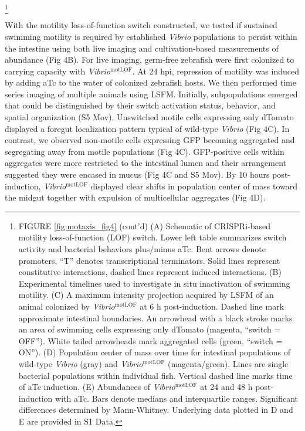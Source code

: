 {{{{\let\thefootnote\relax\footnote{FIGURE \ref{fig:motaxis_fig4} (cont'd) (A) Schematic of CRISPRi-based motility loss-of-function (LOF) switch. Lower left table summarizes switch activity and bacterial behaviors plus/minus aTc. Bent arrows denote promoters, ``T'' denotes transcriptional terminators. Solid lines represent constitutive interactions, dashed lines represent induced interactions. (B) Experimental timelines used to investigate in situ inactivation of swimming motility. (C) A maximum intensity projection acquired by LSFM of an animal colonized by \textit{Vibrio}$^{\text{motLOF}}$ at 6 h post-induction. Dashed line mark approximate intestinal boundaries. An arrowhead with a black stroke marks an area of swimming cells expressing only dTomato (magenta, ``switch = OFF''). White tailed arrowheads mark aggregated cells (green, ``switch = ON''). (D) Population center of mass over time for intestinal populations of wild-type \textit{Vibrio} (gray) and \textit{Vibrio}$^{\text{motLOF}}$ (magenta/green). Lines are single bacterial populations within individual fish. Vertical dashed line marks time of aTc induction. (E) Abundances of \textit{Vibrio}$^{\text{motLOF}}$ at 24 and 48 h post-induction with aTc. Bars denote medians and interquartile ranges. Significant differences determined by Mann-Whitney. Underlying data plotted in D and E are provided in S1 Data.}

With the motility loss-of-function switch constructed, we tested if sustained swimming motility is required by established \textit{Vibrio} populations to persist within the intestine using both live imaging and cultivation-based measurements of abundance (Fig 4B). For live imaging, germ-free zebrafish were first colonized to carrying capacity with \textit{Vibrio}$^{\text{motLOF}}$. At 24 hpi, repression of motility was induced by adding aTc to the water of colonized zebrafish hosts. We then performed time series imaging of multiple animals using LSFM. Initially, subpopulations emerged that could be distinguished by their switch activation status, behavior, and spatial organization (S5 Mov). Unswitched motile cells expressing only dTomato displayed a foregut localization pattern typical of wild-type \textit{Vibrio} (Fig 4C). In contrast, we observed non-motile cells expressing GFP becoming aggregated and segregating away from motile populations (Fig 4C). GFP-positive cells within aggregates were more restricted to the intestinal lumen and their arrangement suggested they were encased in mucus (Fig 4C and S5 Mov). By 10 hours post-induction, \textit{Vibrio}$^{\text{motLOF}}$ displayed clear shifts in population center of mass toward the midgut together with expulsion of multicellular aggregates (Fig 4D).

}}}}
